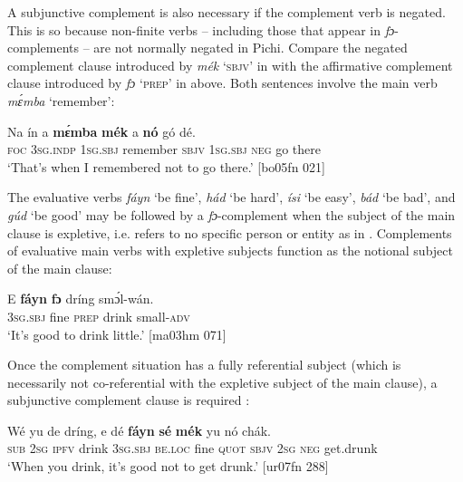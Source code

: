 A subjunctive complement is also necessary if the complement verb is negated. This is so because non-finite verbs – including those that appear in \textit{fɔ}-complements – are not normally negated in Pichi. Compare the negated complement clause introduced by \textit{mék} ‘\textsc{sbjv}’ in  with the affirmative complement clause introduced by \textit{fɔ} ‘\textsc{prep}’ in  above. Both sentences involve the main verb \textit{mɛ́mba} ‘remember’:


\ea%
    \label{ex:key:1394}
    \gll Na  ín    a    \textbf{mɛ́mba}    \textbf{mék}    a    \textbf{nó}  gó  dé.\\
\textsc{foc}  \textsc{3sg.indp}  \textsc{1sg.sbj}  remember  \textsc{sbjv}    \textsc{1sg.sbj}  \textsc{neg}  go  there\\

\glt ‘That’s when I remembered not to go there.’ [bo05fn 021]
\z

The evaluative verbs \textit{fáyn} ‘be fine’, \textit{hád} ‘be hard’, \textit{ísi} ‘be easy’, \textit{bád} ‘be bad’, and \textit{gúd} ‘be good’ may be followed by a \textit{fɔ}{}-complement when the subject of the main clause is expletive, i.e. refers to no specific person or entity as in . Complements of evaluative main verbs with expletive subjects function as the notional subject of the main clause:


\ea%
    \label{ex:key:1395}
    \gll E    \textbf{fáyn}  \textbf{fɔ} dríng  smɔ́l-wán.\\
\textsc{3sg.sbj}  fine    \textsc{prep}  drink  small\textsc{{}-adv}\\

\glt ‘It’s good to drink little.’ [ma03hm 071]
\z

Once the complement situation has a fully referential subject (which is necessarily not co-referential with the expletive subject of the main clause), a subjunctive complement clause is required :


\ea%
    \label{ex:key:1396}
    \gll Wé  yu  de  dríng,  e    dé \textbf{fáyn}  \textbf{sé}    \textbf{mék}  yu  nó  chák.\\
\textsc{sub}  \textsc{2sg}  \textsc{ipfv}  drink  \textsc{3sg.sbj}  \textsc{be.loc}  fine    \textsc{quot}    \textsc{sbjv}    \textsc{2sg}  \textsc{neg}  get.drunk\\

\glt ‘When you drink, it’s good not to get drunk.’ [ur07fn 288]
\z


